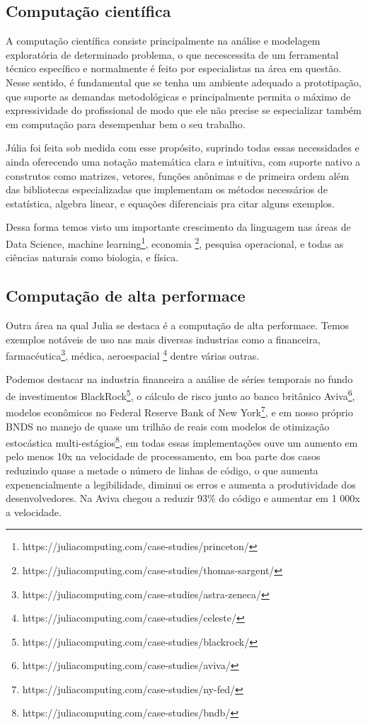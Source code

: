\subsection{Computação científica}

A computação científica consiste principalmente na análise e modelagem exploratória de determinado problema, o que necescessita de um ferramental técnico específico e normalmente é feito por especialistas na área em questão. Nesse sentido, é fundamental que se tenha um ambiente adequado a prototipação, que suporte as demandas metodológicas e principalmente permita o máximo de expressividade do profissional de modo que ele não precise se especializar também em computação para desempenhar bem o seu trabalho. 

Júlia foi feita sob medida com esse propósito, suprindo todas essas necessidades e ainda oferecendo uma notação matemática clara e intuitiva, com suporte nativo a construtos como matrizes, vetores, funções anônimas e de primeira ordem além das bibliotecas especializadas que implementam os métodos necessários de estatística, algebra linear, e equações diferenciais pra citar alguns exemplos. \cite{Klok2021}

Dessa forma temos visto um importante crescimento da linguagem nas áreas de Data Science, machine learning\footnote{https://juliacomputing.com/case-studies/princeton/}, 
economia \footnote{https://juliacomputing.com/case-studies/thomas-sargent/}, 
pesquisa operacional, e todas as ciências naturais como biologia, e física. \cite{Perkel2019}

\subsection{Computação de alta performace}
Outra área na qual Julia se destaca é a computação de alta performace. Temos exemplos notáveis de uso nas mais diversas industrias como a financeira, farmacéutica\footnote{https://juliacomputing.com/case-studies/astra-zeneca/}, médica, aeroespacial \footnote{https://juliacomputing.com/case-studies/celeste/} dentre várias outras. 

Podemos destacar na industria financeira a análise de séries temporais no fundo de investimentos BlackRock\footnote{https://juliacomputing.com/case-studies/blackrock/}, o cálculo de risco junto ao banco britânico Aviva\footnote{https://juliacomputing.com/case-studies/aviva/}, modelos econômicos no Federal Reserve Bank of New York\footnote{https://juliacomputing.com/case-studies/ny-fed/}, e em nosso próprio BNDS no manejo de quase um trilhão de reais com modelos de otimização estocástica multi-estágios\footnote{https://juliacomputing.com/case-studies/bndb/}, em todas essas implementações ouve um aumento em pelo menos 10x na velocidade de processamento, em boa parte dos casos reduzindo quase a metade o número de linhas de código, o que aumenta expenencialmente a legibilidade, diminui os erros e aumenta a produtividade dos desenvolvedores. Na Aviva chegou a reduzir 93\% do código e aumentar em 1 000x a velocidade. 

